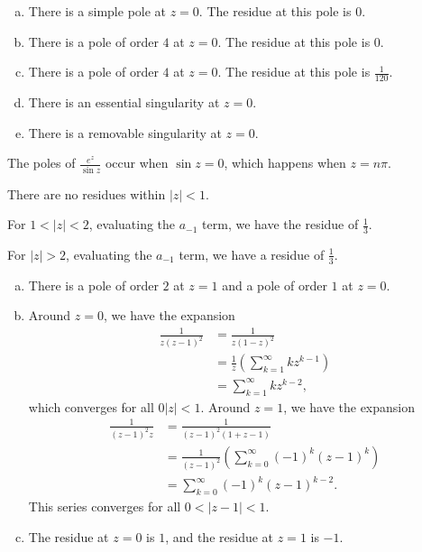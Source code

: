 \documentclass[10pt]{mypackage}
\begin{document}
\RaggedRight
\begin{solution}[19.1]\hfill
  \begin{enumerate}[(a)]
    \item There is a simple pole at $z = 0$. The residue at this pole is $0$.
    \item There is a pole of order $4$ at $z = 0$. The residue at this pole is $0$.
    \item There is a pole of order $4$ at $z = 0$. The residue at this pole is $\frac{1}{120}$.
    \item There is an essential singularity at $z = 0$.
    \item There is a removable singularity at $z = 0$.
  \end{enumerate}
\end{solution}
\begin{solution}[19.2]
  The poles of $\frac{e^z}{\sin z}$ occur when $\sin z = 0$, which happens when $z = n\pi$.
\end{solution}
\begin{solution}[19.4]
  There are no residues within $\left\vert z \right\vert < 1$.\newline

  For $1 < \left\vert z \right\vert < 2$, evaluating the $a_{-1}$ term, we have the residue of $\frac{1}{3}$.\newline

  For $\left\vert z \right\vert > 2$, evaluating the $a_{-1}$ term, we have a residue of $\frac{1}{3}$.
\end{solution}
\begin{solution}[19.5]\hfill
  \begin{enumerate}[(a)]
    \item There is a pole of order $2$ at $z = 1$ and a pole of order $1$ at $z = 0$.
    \item Around $z = 0$, we have the expansion
      \begin{align*}
        \frac{1}{z\left( z-1 \right)^2} &= \frac{1}{z\left( 1-z \right)^2}\\
                                        &= \frac{1}{z}\left( \sum_{k=1}^{\infty}kz^{k-1} \right)\\
                                        &= \sum_{k=1}^{\infty}kz^{k-2},
      \end{align*}
      which converges for all $0 \left\vert z \right\vert < 1$. Around $z = 1$, we have the expansion
      \begin{align*}
        \frac{1}{\left( z-1 \right)^2 z} &= \frac{1}{\left( z-1 \right)^2 \left( 1 + z-1 \right)}\\
                                         &= \frac{1}{\left( z- 1\right)^2} \left( \sum_{k=0}^{\infty}\left( -1 \right)^k\left( z-1 \right)^k \right)\\
                                         &= \sum_{k=0}^{\infty} \left( -1 \right)^k\left( z-1 \right)^{k-2}.
      \end{align*}
      This series converges for all $0 < \left\vert z-1 \right\vert < 1$.
    \item The residue at $z = 0$ is $1$, and the residue at $z = 1$ is $-1$.
  \end{enumerate}
\end{solution}
\end{document}
